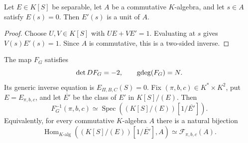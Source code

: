 \begin{lemma}\label{lem:derivative-unit}
Let $E\in K[S]$ be separable, let $A$ be a commutative $K$-algebra, and let
$s\in A$ satisfy $E(s)=0$.  Then $E'(s)$ is a unit of $A$.
\end{lemma}

\begin{proof}
Choose $U,V\in K[S]$ with $UE+VE'=1$.  Evaluating at $s$ gives
$V(s)E'(s)=1$.  Since $A$ is commutative, this is a two-sided inverse.
\end{proof}

\begin{theorem}
\label{thm:localized-gauge}
The map $F_G$ satisfies
\[
 \det DF_G=-2,
 \qquad
 \operatorname{gdeg}(F_G)=N.
\]
Its generic inverse equation is $E_{\Pi,B,C}(S)=0$.  Fix
$(\pi,b,c)\in K^*\times K^2$, put $E=E_{\pi,b,c}$, and let
$\overline{E'}$ be the class of $E'$ in $K[S]/(E)$.  Then
\begin{equation}
 \boxed{
 F_G^{-1}(\pi,b,c)
 \simeq
 \operatorname{Spec}\left((K[S]/(E))[1/\overline{E'}]\right).}
 \label{eq:localized-fiber}
\end{equation}
Equivalently, for every commutative $K$-algebra $A$ there is a natural
bijection
\begin{equation}
 \operatorname{Hom}_{K\text{-alg}}
 \left((K[S]/(E))[1/\overline{E'}],A\right)
 \simeq \mathcal F_{\pi,b,c}(A).
 \label{eq:localized-natural-fiber-equivalence}
\end{equation}
\end{theorem}

